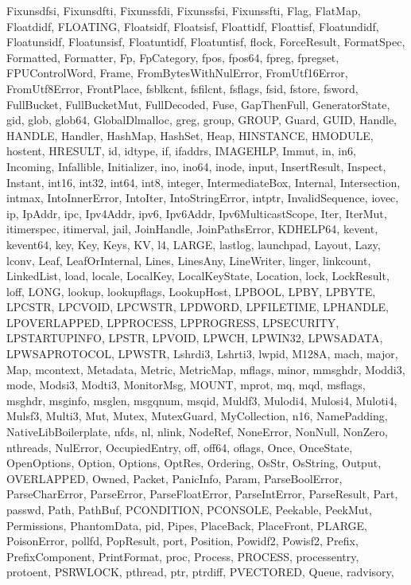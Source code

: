 \documentclass[aspectratio=169]{beamer}
\begin{document}
{{Fixunsdfsi, Fixunsdfti, Fixunssfdi, Fixunssfsi, Fixunssfti, Flag, FlatMap,
Floatdidf, FLOATING, Floatsidf, Floatsisf, Floattidf, Floattisf, Floatundidf,
Floatunsidf, Floatunsisf, Floatuntidf, Floatuntisf, flock, ForceResult,
FormatSpec, Formatted, Formatter, Fp, FpCategory, fpos, fpos64, fpreg, fpregset,
FPUControlWord, Frame, FromBytesWithNulError, FromUtf16Error, FromUtf8Error,
FrontPlace, fsblkcnt, fsfilcnt, fsflags, fsid, fstore, fsword, FullBucket,
FullBucketMut, FullDecoded, Fuse, GapThenFull, GeneratorState, gid, glob,
glob64, GlobalDlmalloc, greg, group, GROUP, Guard, GUID, Handle, HANDLE,
Handler, HashMap, HashSet, Heap, HINSTANCE, HMODULE, hostent, HRESULT, id,
idtype, if, ifaddrs, IMAGEHLP, Immut, in, in6, Incoming, Infallible,
Initializer, ino, ino64, inode, input, InsertResult, Inspect, Instant, int16,
int32, int64, int8, integer, IntermediateBox, Internal, Intersection, intmax,
IntoInnerError, IntoIter, IntoStringError, intptr, InvalidSequence, iovec, ip,
IpAddr, ipc, Ipv4Addr, ipv6, Ipv6Addr, Ipv6MulticastScope, Iter, IterMut,
itimerspec, itimerval, jail, JoinHandle, JoinPathsError, KDHELP64, kevent,
kevent64, key, Key, Keys, KV, l4, LARGE, lastlog, launchpad, Layout, Lazy,
lconv, Leaf, LeafOrInternal, Lines, LinesAny, LineWriter, linger, linkcount,
LinkedList, load, locale, LocalKey, LocalKeyState, Location, lock, LockResult,
loff, LONG, lookup, lookupflags, LookupHost, LPBOOL, LPBY, LPBYTE, LPCSTR,
LPCVOID, LPCWSTR, LPDWORD, LPFILETIME, LPHANDLE, LPOVERLAPPED, LPPROCESS,
LPPROGRESS, LPSECURITY, LPSTARTUPINFO, LPSTR, LPVOID, LPWCH, LPWIN32, LPWSADATA,
LPWSAPROTOCOL, LPWSTR, Lshrdi3, Lshrti3, lwpid, M128A, mach, major, Map,
mcontext, Metadata, Metric, MetricMap, mflags, minor, mmsghdr, Moddi3, mode,
Modsi3, Modti3, MonitorMsg, MOUNT, mprot, mq, mqd, msflags, msghdr, msginfo,
msglen, msgqnum, msqid, Muldf3, Mulodi4, Mulosi4, Muloti4, Mulsf3, Multi3, Mut,
Mutex, MutexGuard, MyCollection, n16, NamePadding, NativeLibBoilerplate, nfds,
nl, nlink, NodeRef, NoneError, NonNull, NonZero, nthreads, NulError,
OccupiedEntry, off, off64, oflags, Once, OnceState, OpenOptions, Option,
Options, OptRes, Ordering, OsStr, OsString, Output, OVERLAPPED, Owned, Packet,
PanicInfo, Param, ParseBoolError, ParseCharError, ParseError, ParseFloatError,
ParseIntError, ParseResult, Part, passwd, Path, PathBuf, PCONDITION, PCONSOLE,
Peekable, PeekMut, Permissions, PhantomData, pid, Pipes, PlaceBack, PlaceFront,
PLARGE, PoisonError, pollfd, PopResult, port, Position, Powidf2, Powisf2,
Prefix, PrefixComponent, PrintFormat, proc, Process, PROCESS, processentry,
protoent, PSRWLOCK, pthread, ptr, ptrdiff, PVECTORED, Queue, radvisory,
}}
\end{document}
